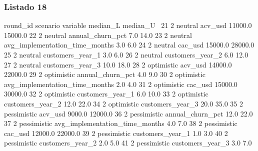 \subsubsection{Listado 18}
\label{anexo:code-6-3-2-18}

\begin{APACode}
    round_id     scenario                        variable  median_L  median_U  \
21         2      neutral                         acv_usd   11000.0   15000.0   
22         2      neutral                annual_churn_pct       7.0      14.0   
23         2      neutral  avg_implementation_time_months       3.0       6.0   
24         2      neutral                         cac_usd   15000.0   28000.0   
25         2      neutral                customers_year_1       3.0       6.0   
26         2      neutral                customers_year_2       6.0      12.0   
27         2      neutral                customers_year_3      10.0      18.0   
28         2   optimistic                         acv_usd   14000.0   22000.0   
29         2   optimistic                annual_churn_pct       4.0       9.0   
30         2   optimistic  avg_implementation_time_months       2.0       4.0   
31         2   optimistic                         cac_usd   15000.0   30000.0   
32         2   optimistic                customers_year_1       6.0      10.0   
33         2   optimistic                customers_year_2      12.0      22.0   
34         2   optimistic                customers_year_3      20.0      35.0   
35         2  pessimistic                         acv_usd    9000.0   12000.0   
36         2  pessimistic                annual_churn_pct      12.0      22.0   
37         2  pessimistic  avg_implementation_time_months       4.0       7.0   
38         2  pessimistic                         cac_usd   12000.0   22000.0   
39         2  pessimistic                customers_year_1       1.0       3.0   
40         2  pessimistic                customers_year_2       2.0       5.0   
41         2  pessimistic                customers_year_3       3.0       7.0   


\end{APACode}
